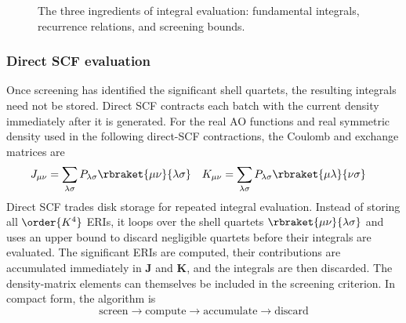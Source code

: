 \documentclass[11pt,a4paper,titlepage]{article}
\numberwithin{equation}{section}
\newcommand{\ba}{\boldsymbol{a}}
\newcommand{\bb}{\boldsymbol{b}}
\newcommand{\bc}{\boldsymbol{c}}
\newcommand{\bd}{\boldsymbol{d}}
\newcommand{\bJ}{\boldsymbol{J}}
\newcommand{\bK}{\boldsymbol{K}}
\newcommand{\bO}{\boldsymbol{0}}
\begin{document}
\begin{figure}[htbp]
 \centering
 \caption{The three ingredients of integral evaluation: fundamental
 integrals, recurrence relations, and screening bounds.}
 \label{fig:integral-recipe}
\end{figure}

\subsubsection{Direct SCF evaluation}

Once screening has identified the significant shell quartets, the resulting
integrals need not be stored. Direct SCF contracts each batch with the current
density immediately after it is generated.
For the real AO functions and real symmetric density used in the following
direct-SCF contractions, the Coulomb and exchange matrices are
\begin{align}
 J_{\mu\nu}&=\sum_{\lambda\sigma}P_{\lambda\sigma}
 \rbraket{\mu\nu}{\lambda\sigma}
 &
 K_{\mu\nu}&=\sum_{\lambda\sigma}P_{\lambda\sigma}
 \rbraket{\mu\lambda}{\nu\sigma}
\end{align}
Direct SCF \citep{Almlof1982} trades disk storage for repeated integral evaluation. Instead of
storing all $\order{K^4}$ ERIs, it loops over the shell quartets
$\rbraket{\mu\nu}{\lambda\sigma}$ and uses an upper bound to discard
negligible quartets before their integrals are evaluated. The significant
ERIs are computed, their contributions are accumulated immediately in $\bJ$
and $\bK$, and the integrals are then discarded.
The density-matrix elements can themselves be included in the screening
criterion. In compact form, the algorithm is
\begin{equation}
 \text{screen}\longrightarrow\text{compute}\longrightarrow
 \text{accumulate}\longrightarrow\text{discard}
\end{equation}
\end{document}
